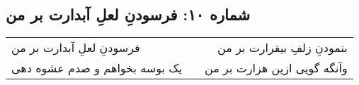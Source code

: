 \begin{center}
\section*{شماره ۱۰: فرسودنِ لعلِ آبدارت بر من}
\label{sec:010}
\begin{longtable}{l p{0.5cm} r}
فرسودنِ لعلِ آبدارت بر من
&&
بنمودنِ زلفِ بیقرارت بر من
\\
یک بوسه بخواهم و صدم عشوه دهی
&&
وآنگه گویی ازین هزارت بر من
\\
\end{longtable}
\end{center}
